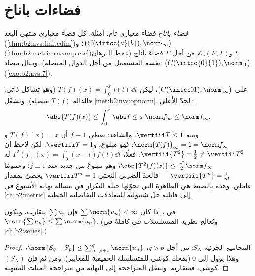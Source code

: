 \section{فضاءات باناخ}

\begin{definition}\label{def:b2:nvs:banach}
\emph{فضاء باناخ} فضاء معياري تام.
أمثلة: كل فضاء معياري منتهي البعد
(\cref{thm:b2:nvs:finitedim})؛ و$\bigl(C(\intcc{a}{b}),
\norm\cdot_\infty\bigr)$ (\cref{thm:b2:metric:rncomplete})؛
و$\mathcal{L}_c(E, F)$ من أجل $F$ فضاءَ باناخ (بنمط البرهان نفسه المستعمل من أجل
الدوال المتصلة). ومثال مضاد: $\bigl(C(\intcc{0}{1}),
\norm\cdot_1\bigr)$ (\cref{exo:b2:nvs:7}).
\end{definition}

\begin{example}\label{ex:b2:nvs:integrationnorm}
على $\bigl(C(\intcc01), \norm\cdot_\infty\bigr)$، ليكن $T(f)(x) =
\int_0^x f(t)\,\dd t$ (وهو تشاكل ذاتي: فالدالة $T(f)$ متصلة).
ونشغّل \cref{met:b2:nvs:opnorm}. الحدّ الأعلى:
\[
\abs{T(f)(x)} \leq \int_0^x\abs f \leq x\,\norm f_\infty \leq
\norm f_\infty ,
\]
ومنه $\vertiii T \leq 1$. والشاهد: يعطي $f \equiv 1$ أن $T(f)(x) =
x$ و$\norm{T(f)}_\infty = 1 = \norm f_\infty$: فهو مبلوغ،
و$\vertiii T = 1$. لكن لاحظ أن $\vertiii{T^2} = \frac12 \neq
\vertiii T^2$: فعلًا، $T^2(f)(x) = \int_0^x(x - t)f(t)\dd t$ له
$\abs{T^2(f)(x)} \leq \frac{x^2}2\norm f_\infty$، وهو مبلوغ من جديد
عند $f \equiv 1$؛ وعمومًا $\vertiii{T^n} = \frac1{n!}$ ---
فالحدّ الضربي التحتي $\vertiii T^n = 1$ يخطئ بمقدار
عاملي. وهذه بالضبط هي الظاهرة التي تحوّلها حيلة التكرار في
مسألة نهاية الأسبوع في \cref{ch:b2:metric} إلى قابلية حلّ
شمولية للمعادلات التفاضلية الخطية.
\end{example}

\begin{theorem}\label{thm:b2:nvs:absoluteconvergence}
في ، إذا كان $\sum \norm{u_n} < \infty$ فإن $\sum u_n$
تتقارب، ويكون $\norm{\sum u_n} \leq \sum\norm{u_n}$. (وتُعالَج
نظرية المتسلسلات في  كاملةً في \cref{ch:b2:series}.)
\end{theorem}

\begin{proof}
المجاميع الجزئية $S_N$: من أجل $q > p$، $\norm{S_q - S_p} \leq
\sum_{n=p+1}^{q}\norm{u_n}$، وهذا يؤول إلى $0$ (بمحك كوشي
للمتسلسلة الحقيقية للمعايير): ومن ثم فإن $(S_N)$ كوشي، فمتقاربة.
وتنتقل المتراجحة إلى النهاية من متراجحة المثلث
المنتهية.
\end{proof}

